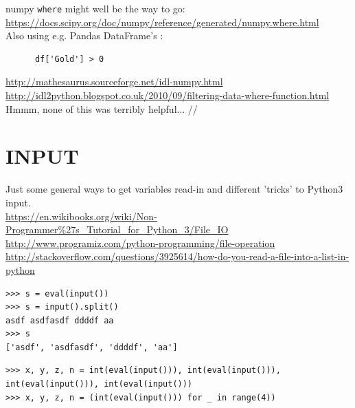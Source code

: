 \documentclass[11pt,a4paper]{article}
\begin{document}
     \smallskip
     \smallskip
     \noindent
     numpy {\tt where} might well be the way to go:
     \href{https://docs.scipy.org/doc/numpy/reference/generated/numpy.where.html}{https://docs.scipy.org/doc/numpy/reference/generated/numpy.where.html}\\

    \smallskip  
    \smallskip 
    \noindent
    Also using e.g. Pandas DataFrame's : 
    \begin{lstlisting}
      df['Gold'] > 0
    \end{lstlisting}


    \href{http://mathesaurus.sourceforge.net/idl-numpy.html}{http://mathesaurus.sourceforge.net/idl-numpy.html}\\
    \href{http://idl2python.blogspot.co.uk/2010/09/filtering-data-where-function.html}{http://idl2python.blogspot.co.uk/2010/09/filtering-data-where-function.html}\\
    Hmmm, none of this was terribly helpful... //
    





\newpage
\section{INPUT}
Just some general ways to get variables read-in and different 'tricks' to Python3 input. \\
\href{https://en.wikibooks.org/wiki/Non-Programmer\%27s\_Tutorial\_for\_Python\_3/File\_IO}{https://en.wikibooks.org/wiki/Non-Programmer\%27s\_Tutorial\_for\_Python\_3/File\_IO}\\
\href{http://www.programiz.com/python-programming/file-operation}{http://www.programiz.com/python-programming/file-operation}\\
\href{http://stackoverflow.com/questions/3925614/how-do-you-read-a-file-into-a-list-in-python}{http://stackoverflow.com/questions/3925614/how-do-you-read-a-file-into-a-list-in-python}\\


\begin{lstlisting}
>>> s = eval(input())
>>> s = input().split()
asdf asdfasdf ddddf aa
>>> s
['asdf', 'asdfasdf', 'ddddf', 'aa']
\end{lstlisting}

\begin{lstlisting}
>>> x, y, z, n = int(eval(input())), int(eval(input())), int(eval(input())), int(eval(input()))
>>> x, y, z, n = (int(eval(input())) for _ in range(4))
\end{lstlisting}
\end{document}
